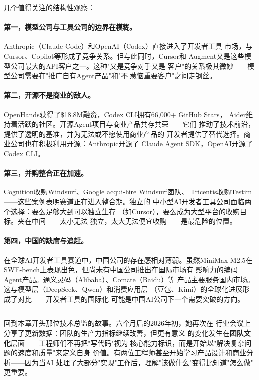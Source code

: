 几个值得关注的结构性观察：

\paragraph{第一，模型公司与工具公司的边界在模糊。}
Anthropic（Claude Code）和OpenAI（Codex）直接进入了开发者工具
市场，与Cursor、Copilot等形成了竞争关系。但与此同时，Cursor和
Augment又是这些模型公司最大的API客户之一。这种"又是竞争对手又是
客户"的关系极其微妙——模型公司需要在"推广自有Agent产品"和"不
惹恼重要客户"之间走钢丝。

\paragraph{第二，开源不是商业的敌人。}
OpenHands获得了\$18.8M融资，Codex CLI拥有66,000+ GitHub Stars，
Aider维持着活跃的社区。开源Agent项目与商业产品共存共荣——它们
推动了技术前沿，提供了透明的基准，并为无法或不愿使用商业产品的
开发者提供了替代选择。商业公司也在积极利用开源：Anthropic开源了
Claude Agent SDK，OpenAI开源了Codex CLI。

\paragraph{第三，并购整合正在加速。}
Cognition收购Windsurf、Google acqui-hire Windsurf团队、
Tricentis收购Testim——这些案例表明赛道正在进入整合期。独立的
中小型AI开发者工具公司面临两个选择：要么足够大到可以独立生存
（如Cursor），要么成为大型平台的收购目标。夹在中间——太小无法
独立，太大无法便宜收购——是最危险的位置。

\paragraph{第四，中国的缺席与追赶。}
在全球AI开发者工具赛道中，中国公司的存在感相对薄弱。虽然MiniMax
M2.5在SWE-bench上表现出色，但尚未有中国公司推出在国际市场有
影响力的编码Agent产品。通义灵码（Alibaba）、Comate（Baidu）等
产品主要服务国内市场。这与模型层（DeepSeek、Qwen）和消费应用层
（豆包、Kimi）的全球化进展形成了对比——开发者工具的国际化
可能是中国AI公司下一个需要突破的方向。

\bigskip

\noindent\rule{\textwidth}{0.5pt}

\bigskip

回到本章开头那位技术总监的故事。六个月后的2026年初，她再次在
行业会议上分享了更新数据：团队的生产力指标继续改善，但更有意义
的变化发生在\textbf{团队文化}层面——工程师们不再把"写代码"视为
核心能力标识，而是开始以"解决复杂问题的速度和质量"来定义自身
价值。有两位工程师甚至开始学习产品设计和商业分析——因为当AI
处理了大部分"实现"工作后，理解"该做什么"变得比知道"怎么做"
更重要。

